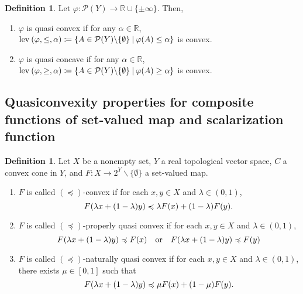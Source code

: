 \documentclass[a4paper,11pt]{jsarticle}
\theoremstyle{definition}
\newtheorem{dfn}[thm]{Definition}
\newcommand{\RealNumberSet}{\mathbb{R}}
\newcommand{\OrderingLevelSets}[3]{\text{\rm lev\:$({#1}, {#2}, {#3})$}} %
\newcommand{\SetForm}[2]{
  \{{#1}\:|\:{#2}\}
}
\begin{document}
\begin{dfn}
  Let $\varphi \colon \mathcal{P}(Y) \to \RealNumberSet \cup \{\pm \infty\}$. Then,
  \begin{enumerate}
    \item $\varphi$ is quasi convex if for any $\alpha \in \RealNumberSet$,
          $\OrderingLevelSets{\varphi}{\leq}{\alpha} \coloneqq \SetForm{A \in \mathcal{P}(Y) \backslash \{\emptyset\}}{\varphi(A) \leq \alpha}$ is convex.
    \item $\varphi$ is quasi concave if for any $\alpha \in \RealNumberSet$,
          $\OrderingLevelSets{\varphi}{\geq}{\alpha} \coloneqq \SetForm{A \in \mathcal{P}(Y) \backslash \{\emptyset\}}{\varphi(A) \geq \alpha}$ is convex.
  \end{enumerate}
\end{dfn}

\subsection{Quasiconvexity properties for composite functions of set-valued map and scalarization function}

\begin{dfn}
  Let $X$ be a nonempty set, $Y$ a real topological vector space, $C$ a convex cone in $Y$, and $F\colon X \to 2^Y \backslash \{\emptyset\}$ a set-valued map.
  \begin{enumerate}
    \item $F$ is called $(\preccurlyeq)$-convex if for each $x,y \in X$ and $\lambda \in (0,1)$,
          \begin{equation}
            F(\lambda x + (1-\lambda)y) \preccurlyeq \lambda F(x) + (1-\lambda) F(y). \notag
          \end{equation}
    \item $F$ is called $(\preccurlyeq)$-properly quasi convex if for each $x,y \in X$ and $\lambda \in (0,1)$,
          \begin{equation}
            F(\lambda x + (1-\lambda)y) \preccurlyeq F(x) \quad \text{or} \quad F(\lambda x + (1-\lambda)y) \preccurlyeq F(y) \notag
          \end{equation}
    \item $F$ is called $(\preccurlyeq)$-naturally quasi convex if for each $x,y \in X$ and $\lambda \in (0,1)$, there exists $\mu \in [0,1]$ such that
          \begin{equation}
            F(\lambda x + (1-\lambda)y) \preccurlyeq \mu F(x) + (1-\mu) F(y). \notag
          \end{equation}
  \end{enumerate}
\end{dfn}
\end{document}
